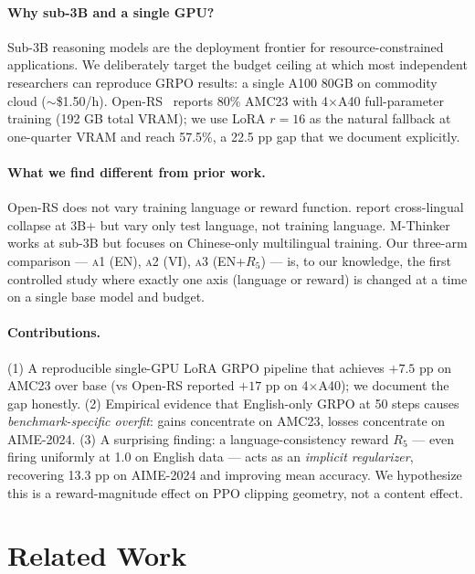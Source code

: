 \documentclass[11pt]{article}
\newcommand{\armA}{\textsc{a1}}
\newcommand{\armB}{\textsc{a2}}
\newcommand{\armC}{\textsc{a3}}
\begin{document}
\paragraph{Why sub-3B and a single GPU?}
Sub-3B reasoning models are the deployment frontier for resource-constrained
applications. We deliberately target the budget ceiling at which most independent
researchers can reproduce GRPO results: a single A100 80GB on commodity cloud
($\sim$\$1.50/h). Open-RS~\cite{openRS_2025} reports 80\% AMC23 with 4$\times$A40
full-parameter training (192 GB total VRAM); we use LoRA $r{=}16$ as the natural
fallback at one-quarter VRAM and reach 57.5\%, a 22.5 pp gap that we document
explicitly.

\paragraph{What we find different from prior work.}
Open-RS does not vary training language or reward function.
\citet{xlingual_collapse_2025} report cross-lingual collapse at 3B+ but vary only test
language, not training language. M-Thinker~\cite{mthinker_2025} works at sub-3B but
focuses on Chinese-only multilingual training. Our three-arm comparison ---
\armA{} (EN), \armB{} (VI), \armC{} (EN+$R_5$) --- is, to our knowledge, the first
controlled study where exactly one axis (language or reward) is changed at a time
on a single base model and budget.

\paragraph{Contributions.}
(1) A reproducible single-GPU LoRA GRPO pipeline that achieves $+7.5$ pp on AMC23
over base (vs Open-RS reported $+17$ pp on 4$\times$A40); we document the gap honestly.
(2) Empirical evidence that English-only GRPO at 50 steps causes
\emph{benchmark-specific overfit}: gains concentrate on AMC23, losses concentrate
on AIME-2024.
(3) A surprising finding: a language-consistency reward $R_5$ --- even firing uniformly
at 1.0 on English data --- acts as an \emph{implicit regularizer}, recovering 13.3 pp
on AIME-2024 and improving mean accuracy. We hypothesize this is a reward-magnitude
effect on PPO clipping geometry, not a content effect.

\section{Related Work}
\label{sec:related}
\end{document}
